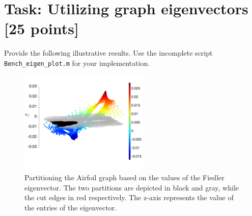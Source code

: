 \documentclass[unicode,11pt,a4paper,oneside,numbers=endperiod,openany]{scrartcl}
\begin{document}
\section{Task: Utilizing graph eigenvectors [25 points]}


Provide the following illustrative results. Use the incomplete script \texttt{Bench\_eigen\_plot.m} for your implementation.

\begin{figure}[!t]
	\begin{center}
		\includegraphics[width=0.55\textwidth]{images/fiedler_airfoil.png}
		\caption{Partitioning the Airfoil graph based on the values of the Fiedler eigenvector. The two partitions are depicted in black and gray, while the cut edges in red respectively. The z-axis represents the value of the entries of the eigenvector.}
		 \label{fig:fiedler_airfoil}
	\end{center}
\end{figure}
\end{document}
